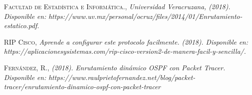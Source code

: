 \begin{thebibliography}{}
 \textsc{Facultad de Estadística e Informática.},
\textit{Universidad Veracruzana, (2018). Disponible en: https://www.uv.mx/personal/ocruz/files/2014/01/Enrutamiento-estatico.pdf.}

 \textsc{RIP Cisco},
\textit{Aprende a configurar este protocolo facilmente. (2018). Disponible en: https://aplicacionesysistemas.com/rip-cisco-version2-de-manera-facil-y-sencilla/.}

 \textsc{Fernández, R.},
\textit{(2018). Enrutamiento dinámico OSPF con Packet Tracer. Disponible en: https://www.raulprietofernandez.net/blog/packet-tracer/enrutamiento-dinamico-ospf-con-packet-tracer}

\end{thebibliography}